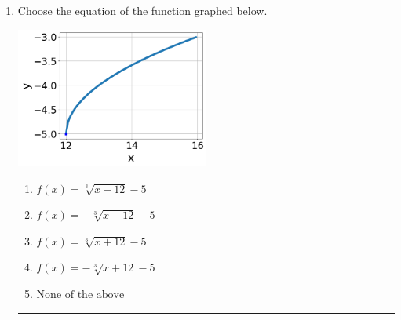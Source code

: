 \documentclass[14pt]{extbook}
\newcommand{\litem}[1]{\item#1\hspace*{-1cm}\rule{\textwidth}{0.4pt}}
\begin{document}
\begin{enumerate}
{\begin{enumerate}[label=\Alph*.]
\end{enumerate} }
\litem{
Choose the equation of the function graphed below.
\begin{center}
    \includegraphics[width=0.5\textwidth]{../Figures/radicalGraphToEquationA.png}
\end{center}
\begin{enumerate}[label=\Alph*.]
\item \( f(x) = \sqrt[3]{x - 12} - 5 \)
\item \( f(x) = - \sqrt[3]{x - 12} - 5 \)
\item \( f(x) = \sqrt[3]{x + 12} - 5 \)
\item \( f(x) = - \sqrt[3]{x + 12} - 5 \)
\item \( \text{None of the above} \)


\end{enumerate}}
\end{enumerate}
\end{document}
